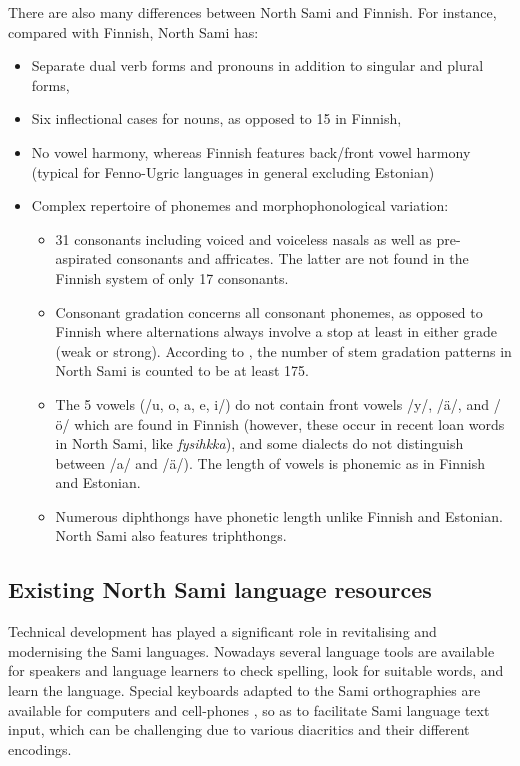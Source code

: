 \documentclass[runningheads,a4paper]{llncs}
\begin{document}
There are also many differences between North Sami and Finnish. For instance, compared with Finnish, North Sami has:

\begin{itemize}
\item Separate dual verb forms and pronouns in addition to singular and plural forms,
\item Six inflectional cases for nouns, as opposed to 15 in Finnish,
\item No vowel harmony, whereas Finnish features back/front vowel harmony (typical for Fenno-Ugric languages in general excluding Estonian)
\item Complex repertoire of phonemes and morphophonological variation:
\begin{itemize}
\item 31 consonants including voiced and voiceless nasals as well as pre-aspirated consonants and affricates. The latter are not found in the Finnish system of only 17 consonants.
\item Consonant gradation concerns all consonant phonemes, as opposed to Finnish where alternations always involve a stop at least in either grade (weak or strong). According to \cite{Sammallahti:98}, the number of stem gradation patterns in North Sami is counted to be at least 175.
\item The 5 vowels (/u, o, a, e, i/) do not contain front vowels /y/, /\"a/, and /\"o/ which are found in Finnish (however, these occur in recent loan words in North Sami, like \textit{fysihkka}), and some dialects do not distinguish between /a/ and /\"a/). The length of vowels is phonemic as in Finnish and Estonian.
\item Numerous diphthongs have phonetic length unlike Finnish and Estonian. North Sami also features triphthongs.
\end{itemize}
\end{itemize}


\subsection{Existing North Sami language resources}
\label{sec:resources}

Technical development has played a significant role in revitalising and modernising the Sami languages. Nowadays several language tools are available for speakers and language learners to check spelling, look for suitable words, and learn the language. Special keyboards adapted to the Sami orthographies are available for computers and cell-phones \cite{Tromso:keyboards}, so as to facilitate Sami language text input, which can be challenging due to various diacritics and their different encodings.
\end{document}

